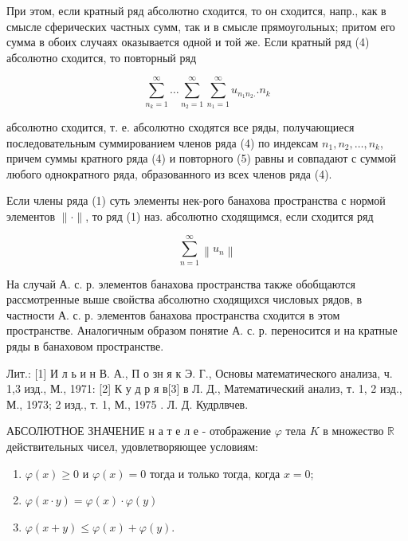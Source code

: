\documentclass[10pt]{article}
\begin{document}
При этом, если кратный ряд абсолютно сходится, то он сходится, напр., как в смысле сферических частных сумм, так и в смысле прямоугольных; притом его сумма в обоих случаях оказывается одной и той же. Если кратный ряд (4) абсолютно сходится, то повторный ряд



\[

\sum_{n_{k}=1}^{\infty} \ldots \sum_{n_{2}=1}^{\infty} \sum_{n_{1}=1}^{\infty} u_{n_{1} n_{2} .} . n_{k}

\]



абсолютно сходится, т. е. абсолютно сходятся все ряды, получающиеся последовательным суммированием членов ряда (4) по индексам $n_{1}, n_{2}, \ldots, n_{k}$, причем суммы кратного ряда (4) и повторного (5) равны и совпадают с суммой любого однократного ряда, образованного из всех членов ряда (4).



Если члены ряда (1) суть элементы нек-рого банахова пространства с нормой элементов $\|\cdot\|$, то ряд (1) наз. абсолютно сходящимся, если сходится ряд



\[

\sum_{n=1}^{\infty}\left\|u_{n}\right\|

\]



На случай А. с. р. элементов банахова пространства также обобщаются рассмотренные выше свойства абсолютно сходящихся числовых рядов, в частности А. с. р. элементов банахова пространства сходится в этом пространстве. Аналогичным образом понятие А. с. р. переносится и на кратные ряды в банаховом пространстве.



Лит.: [1] И л ь и н В. А., П о зн я к Э. Г., Основы математического анализа, ч. 1,3 изд., М., 1971: [2] К у д р я в[3] в Л. Д., Математический анализ, т. 1, 2 изд., М., 1973; 2 изд., т. 1, М., 1975 . Л. Д. Кудрлвчев.



АБСОЛЮТНОЕ ЗНАЧЕНИЕ н а т е л е - отображение $\varphi$ тела $K$ в множество $\mathbb{R}$ действительных чисел, удовлетворяющее условиям:



\begin{enumerate}

  \item $\varphi(x) \geqslant 0$ и $\varphi(x)=0$ тогда и только тогда, когда $x=0$;



  \item $\varphi(x \cdot y)=\varphi(x) \cdot \varphi(y)$



  \item $\varphi(x+y) \leqslant \varphi(x)+\varphi(y)$.



\end{enumerate}
\end{document}

